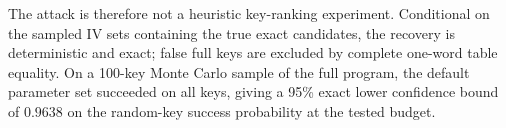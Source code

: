 \documentclass[11pt]{article}
\begin{document}
The attack is therefore not a heuristic key-ranking experiment. Conditional on the sampled IV sets containing the true exact candidates, the recovery is deterministic and exact; false full keys are excluded by complete one-word table equality. On a 100-key Monte Carlo sample of the full program, the default parameter set succeeded on all keys, giving a 95\% exact lower confidence bound of $0.9638$ on the random-key success probability at the tested budget.
\end{document}
